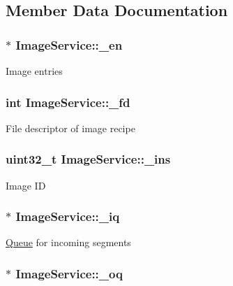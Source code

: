 \subsection{\-Member \-Data \-Documentation}
\hypertarget{structImageService_aa81ed60d68af977e73501d0de5cc5fa1}{
\subsubsection[{\-\_\-en}]{$\ast$ {\bf \-Image\-Service\-::\-\_\-en}}}\label{structImageService_aa81ed60d68af977e73501d0de5cc5fa1}
\-Image entries \hypertarget{structImageService_a5f34b2f826168cd5e135942a2f1b0d00}{
\subsubsection[{\-\_\-fd}]{\setlength{\rightskip}{0pt plus 5cm}int {\bf \-Image\-Service\-::\-\_\-fd}}}\label{structImageService_a5f34b2f826168cd5e135942a2f1b0d00}
\-File descriptor of image recipe \hypertarget{structImageService_a206c07b8c49b019da7e2f9458a6ce04d}{
\subsubsection[{\-\_\-ins}]{\setlength{\rightskip}{0pt plus 5cm}uint32\-\_\-t {\bf \-Image\-Service\-::\-\_\-ins}}}\label{structImageService_a206c07b8c49b019da7e2f9458a6ce04d}
\-Image \-I\-D \hypertarget{structImageService_a64bd56a8275013437625425c4dea8b26}{
\subsubsection[{\-\_\-iq}]{$\ast$ {\bf \-Image\-Service\-::\-\_\-iq}}}\label{structImageService_a64bd56a8275013437625425c4dea8b26}
\hyperlink{structQueue}{\-Queue} for incoming segments \hypertarget{structImageService_a108f7dbf9ff6ef4af5da79c8a7b4e795}{
\subsubsection[{\-\_\-oq}]{$\ast$ {\bf \-Image\-Service\-::\-\_\-oq}}}\label{structImageService_a108f7dbf9ff6ef4af5da79c8a7b4e795}
